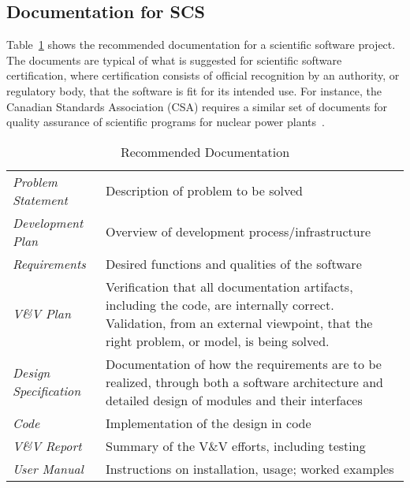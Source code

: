 \documentclass[12pt]{article}
\begin{document}
\subsection{Documentation for SCS} \label{SecDocumentation}

Table~\ref{TblDocuments} shows the recommended documentation for a scientific
software project.  The documents are typical of what is suggested for scientific
software certification, where certification consists of official recognition by
an authority, or regulatory body, that the software is fit for its intended use.
For instance, the Canadian Standards Association (CSA) requires a similar set of
documents for quality assurance of scientific programs for nuclear power
plants~\cite{CSA1999}.

\begin{table}[!h]
  \caption{Recommended Documentation} \label{TblDocuments}
  
  \begin{tabular}{l p{8cm}}
    \textit{Problem Statement} & Description of problem to be solved\\
    \textit{Development Plan} & Overview of development process/infrastructure\\
    \textit{Requirements} & Desired functions and qualities of the software\\
    \textit{V\&V Plan} & Verification that all documentation artifacts,
                           including the code, are internally correct.
                           Validation, from an external viewpoint, that the right
                           problem, or model, is being solved.\\
    \textit{Design Specification} & Documentation of how the requirements are to
                                    be realized, through both a software
                                    architecture and detailed design of modules
                                    and their interfaces\\
    \textit{Code} & Implementation of the design in code\\
    \textit{V\&V Report} & Summary of the V\&V efforts,
                             including testing\\
    \textit{User Manual} & Instructions on installation, usage; worked examples\\
  \end{tabular}
\end{table}
\end{document}
